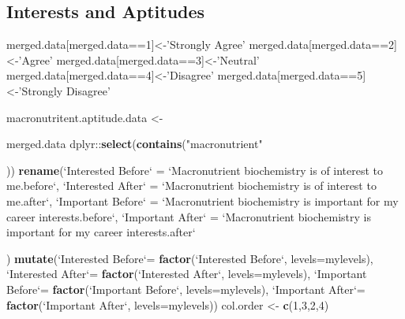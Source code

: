 \documentclass[]{article}
\newenvironment{Shaded}{\begin{snugshade}}{\end{snugshade}}
\newcommand{\KeywordTok}[1]{\textcolor[rgb]{0.13,0.29,0.53}{\textbf{{#1}}}}
\newcommand{\DataTypeTok}[1]{\textcolor[rgb]{0.13,0.29,0.53}{{#1}}}
\newcommand{\DecValTok}[1]{\textcolor[rgb]{0.00,0.00,0.81}{{#1}}}
\newcommand{\StringTok}[1]{\textcolor[rgb]{0.31,0.60,0.02}{{#1}}}
\newcommand{\NormalTok}[1]{{#1}}
\begin{document}
\subsection{Interests and Aptitudes}\label{interests-and-aptitudes}

\begin{Shaded}
\begin{Highlighting}[]
\NormalTok{merged.data[merged.data==}\DecValTok{1}\NormalTok{]<-}\StringTok{'Strongly Agree'}
\NormalTok{merged.data[merged.data==}\DecValTok{2}\NormalTok{]<-}\StringTok{'Agree'}
\NormalTok{merged.data[merged.data==}\DecValTok{3}\NormalTok{]<-}\StringTok{'Neutral'}
\NormalTok{merged.data[merged.data==}\DecValTok{4}\NormalTok{]<-}\StringTok{'Disagree'}
\NormalTok{merged.data[merged.data==}\DecValTok{5}\NormalTok{]<-}\StringTok{'Strongly Disagree'}


\NormalTok{macronutritent.aptitude.data <-}\StringTok{ }
\StringTok{  }\NormalTok{merged.data %
\StringTok{  }\NormalTok{dplyr::}\KeywordTok{select}\NormalTok{(}\KeywordTok{contains}\NormalTok{(}\StringTok{"macronutrient"}\NormalTok{)) %
\StringTok{  }\KeywordTok{rename}\NormalTok{(}\StringTok{`}\DataTypeTok{Interested Before}\StringTok{`} \NormalTok{=}\StringTok{ `}\DataTypeTok{Macronutrient biochemistry is of interest to me.before}\StringTok{`}\NormalTok{,}
         \StringTok{`}\DataTypeTok{Interested After}\StringTok{`} \NormalTok{=}\StringTok{ `}\DataTypeTok{Macronutrient biochemistry is of interest to me.after}\StringTok{`}\NormalTok{,}
         \StringTok{`}\DataTypeTok{Important Before}\StringTok{`} \NormalTok{=}\StringTok{ `}\DataTypeTok{Macronutrient biochemistry is important for my career interests.before}\StringTok{`}\NormalTok{,}
         \StringTok{`}\DataTypeTok{Important After}\StringTok{`} \NormalTok{=}\StringTok{ `}\DataTypeTok{Macronutrient biochemistry is important for my career interests.after}\StringTok{`}\NormalTok{) %
\StringTok{  }\KeywordTok{mutate}\NormalTok{(}\StringTok{`}\DataTypeTok{Interested Before}\StringTok{`}\NormalTok{=}\StringTok{ }\KeywordTok{factor}\NormalTok{(}\StringTok{`}\DataTypeTok{Interested Before}\StringTok{`}\NormalTok{, }\DataTypeTok{levels=}\NormalTok{mylevels),}
         \StringTok{`}\DataTypeTok{Interested After}\StringTok{`}\NormalTok{=}\StringTok{ }\KeywordTok{factor}\NormalTok{(}\StringTok{`}\DataTypeTok{Interested After}\StringTok{`}\NormalTok{, }\DataTypeTok{levels=}\NormalTok{mylevels),}
         \StringTok{`}\DataTypeTok{Important Before}\StringTok{`}\NormalTok{=}\StringTok{ }\KeywordTok{factor}\NormalTok{(}\StringTok{`}\DataTypeTok{Important Before}\StringTok{`}\NormalTok{, }\DataTypeTok{levels=}\NormalTok{mylevels),}
         \StringTok{`}\DataTypeTok{Important After}\StringTok{`}\NormalTok{=}\StringTok{ }\KeywordTok{factor}\NormalTok{(}\StringTok{`}\DataTypeTok{Important After}\StringTok{`}\NormalTok{, }\DataTypeTok{levels=}\NormalTok{mylevels))}
\NormalTok{col.order <-}\StringTok{ }\KeywordTok{c}\NormalTok{(}\DecValTok{1}\NormalTok{,}\DecValTok{3}\NormalTok{,}\DecValTok{2}\NormalTok{,}\DecValTok{4}\NormalTok{)}

}}}
\end{Highlighting}
\end{Shaded}
\end{document}
